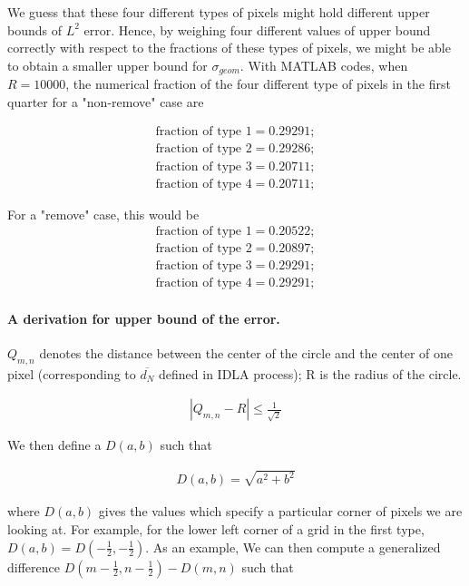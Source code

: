\documentclass[letterpaper]{article}
\numberwithin{equation}{section} %
\numberwithin{figure}{section} %
\numberwithin{table}{section} %
\begin{document}
\noindent
We guess that these four different types of pixels might hold different upper bounds of $L^2$ error. Hence, by weighing four different values of upper bound correctly with respect to the fractions of these types of pixels, we might be able to obtain a smaller upper bound for $\sigma_{geom}$. With MATLAB codes, when $R=10000$, the numerical fraction of the four different type of pixels in the first quarter for a "non-remove" case are 

\begin{align} 
\text{fraction of type 1}=0.29291; \\
\text{fraction of type 2}=0.29286; \\
\text{fraction of type 3}=0.20711; \\
\text{fraction of type 4}=0.20711; 
\end{align}

\noindent
For a "remove" case, this would be
\begin{align} 
\text{fraction of type 1}=0.20522; \\
\text{fraction of type 2}=0.20897; \\
\text{fraction of type 3}=0.29291; \\
\text{fraction of type 4}=0.29291; 
\end{align}

\paragraph{A derivation for upper bound of the error.}
$Q_{m,n}$ denotes the distance between the center of the circle and the center of one pixel (corresponding to $\overline{d_N}$ defined in IDLA process); R is the radius of the circle.

\begin{align} 
|Q_{m,n}-R| \leq \frac{1}{\sqrt{2}} 
\end{align}

\noindent
We then define a $D(a,b)$ such that

\begin{align} 
D(a,b) = \sqrt{a^2+b^2} 
\end{align}

\noindent
where $D(a,b)$ gives the values which specify a particular corner of pixels we are looking at. For example, for the lower left corner of a grid in the first type, $D(a,b)=D(-\frac{1}{2},-\frac{1}{2})$. As an example, We can then compute a generalized difference $D(m-\frac{1}{2}, n-\frac{1}{2})-D(m,n)$ such that
\end{document}

